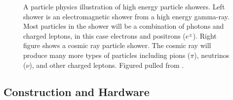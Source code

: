 \begin{figure}
    \caption{A particle physics illustration of high energy particle showers. Left shower is an electromagnetic shower from a high energy gamma-ray. Most particles in the shower will be a combination of photons and charged leptons, in this case electrons and positrons ($e^\pm$). Right figure shows a cosmic ray particle shower. The cosmic ray will produce many more types of particles including pions ($\pi$), neutrinos ($\nu$), and other charged leptons. Figured pulled from \cite{lopez_thesis}.}
    \label{fig:airshowers}
\end{figure}

\subsection{Construction and Hardware} \label{sec:hawc_hardware}

